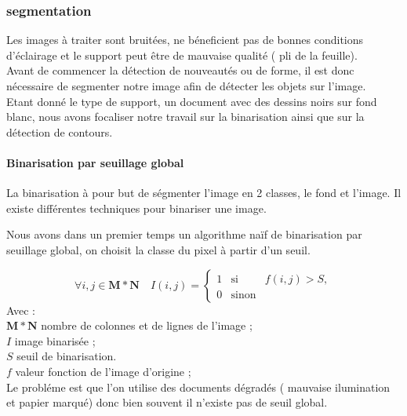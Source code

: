 

\subsubsection{segmentation}

Les images à traiter sont bruitées, ne béneficient pas de bonnes conditions d'éclairage et le support peut être de mauvaise qualité ( pli de la feuille).\\
Avant de commencer la détection de nouveautés ou de forme, il est donc nécessaire de segmenter notre image afin de détecter les objets sur l'image.\\
Etant donné le type de support, un document avec des dessins noirs sur fond blanc, nous avons focaliser notre travail sur la binarisation ainsi que sur la détection de contours.

\paragraph{Binarisation par seuillage global\vspace{0.5cm}\\}

La binarisation à pour but de ségmenter l'image en 2 classes, le fond et l'image.
Il existe différentes techniques pour binariser une image.

Nous avons dans un premier temps un algorithme naïf de binarisation par seuillage global, on choisit la classe du pixel à partir d'un seuil.

\begin{equation}
	\forall i,j \in \mathbf{M*N} \quad I(i,j)=
	\left\lbrace
	\begin{array}{ccc}
		1 &\mbox{si}& f(i,j) > S,\\
		0 &\mbox{sinon}&
	\end{array}\right.
\end{equation}
Avec : \\
$\mathbf{M*N}$ nombre de colonnes et de lignes de l’image ;\\
$I$ image binarisée ;\\
$S$ seuil de binarisation.\\
$f$ valeur fonction de l’image d’origine ;\\



Le probléme est que l'on utilise des documents dégradés ( mauvaise ilumination et papier marqué) donc bien souvent il n'existe pas de seuil global.


